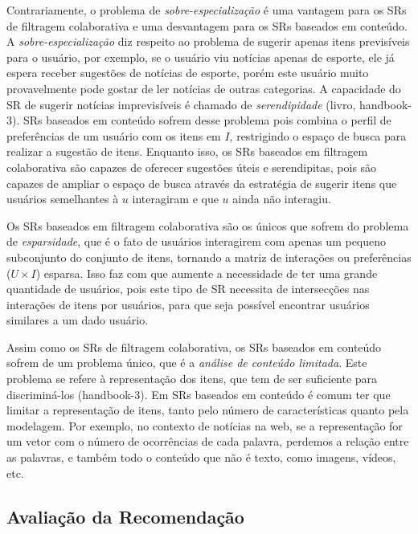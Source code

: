 \documentclass[normaltoc, espacoumemeio, pnumromarab,ruledheader]{abnt}
\begin{document}
Contrariamente, o problema de \textit{sobre-especialização} é uma vantagem para os SRs de filtragem colaborativa e uma desvantagem para os SRs baseados em conteúdo.
A \textit{sobre-especialização} diz respeito ao problema de sugerir apenas itens previsíveis para o usuário, por exemplo, se o usuário viu notícias apenas de esporte, ele já espera receber sugestões de notícias de esporte, porém este usuário muito provavelmente pode gostar de ler notícias de outras categorias.
A capacidade do SR de sugerir notícias imprevisíveis é chamado de \textit{serendipidade} (livro, handbook-3).
SRs baseados em conteúdo sofrem desse problema pois combina o perfil de preferências de um usuário com os itens em $I$, restrigindo o espaço de busca para realizar a sugestão de itens.
Enquanto isso, os SRs baseados em filtragem colaborativa são capazes de oferecer sugestões úteis e serendipitas, pois são capazes de ampliar o espaço de busca através da estratégia de sugerir itens que usuários semelhantes à $u$ interagiram e que $u$ ainda não interagiu.

Os SRs baseados em filtragem colaborativa são os únicos que sofrem do problema de \textit{esparsidade}, que é o fato de usuários interagirem com apenas um pequeno subconjunto do conjunto de itens, tornando a matriz de interações ou preferências ($U \times I$) esparsa.
Isso faz com que aumente a necessidade de ter uma grande quantidade de usuários, pois este tipo de SR necessita de intersecções nas interações de itens por usuários, para que seja possível encontrar usuários similares a um dado usuário.

Assim como os SRs de filtragem colaborativa, os SRs baseados em conteúdo sofrem de um problema único, que é a \textit{análise de conteúdo limitada}.
Este problema se refere à representação dos itens, que tem de ser suficiente para discriminá-los (handbook-3).
Em SRs baseados em conteúdo é comum ter que limitar a representação de itens, tanto pelo número de características quanto pela modelagem.
Por exemplo, no contexto de notícias na web, se a representação for um vetor com o número de ocorrências de cada palavra, perdemos a relação entre as palavras, e também todo o conteúdo que não é texto, como imagens, vídeos, etc.

 \subsection{Avaliação da Recomendação}

\end{document}
